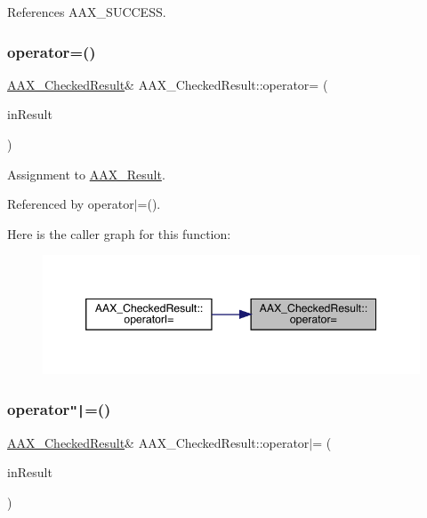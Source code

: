 References A\+A\+X\+\_\+\+S\+U\+C\+C\+E\+SS.

\mbox{\label{a01601_af95bea6f011d9a779170fc6128dc7295}} 
\subsubsection{\texorpdfstring{operator=()}{operator=()}}
{\footnotesize\ttfamily \mbox{\hyperlink{a01601}{A\+A\+X\+\_\+\+Checked\+Result}}\& A\+A\+X\+\_\+\+Checked\+Result\+::operator= (\begin{DoxyParamCaption}\item[{\mbox{\hyperlink{a00392_a4d8f69a697df7f70c3a8e9b8ee130d2f}{A\+A\+X\+\_\+\+Result}}}]{in\+Result }\end{DoxyParamCaption})\hspace{0.3cm}{\ttfamily [inline]}}



Assignment to \mbox{\hyperlink{a00392_a4d8f69a697df7f70c3a8e9b8ee130d2f}{A\+A\+X\+\_\+\+Result}}. 



Referenced by operator$\vert$=().

Here is the caller graph for this function\+:
\nopagebreak
\begin{figure}[H]
\begin{center}
\leavevmode
\includegraphics[width=346pt]{a01601_af95bea6f011d9a779170fc6128dc7295_icgraph}
\end{center}
\end{figure}
\mbox{\label{a01601_a5be1639dbab20f74265dfad8685e7f9f}} 
\subsubsection{\texorpdfstring{operator\texttt{"|}=()}{operator|=()}}
{\footnotesize\ttfamily \mbox{\hyperlink{a01601}{A\+A\+X\+\_\+\+Checked\+Result}}\& A\+A\+X\+\_\+\+Checked\+Result\+::operator$\vert$= (\begin{DoxyParamCaption}\item[{\mbox{\hyperlink{a00392_a4d8f69a697df7f70c3a8e9b8ee130d2f}{A\+A\+X\+\_\+\+Result}}}]{in\+Result }\end{DoxyParamCaption})\hspace{0.3cm}{\ttfamily [inline]}}




